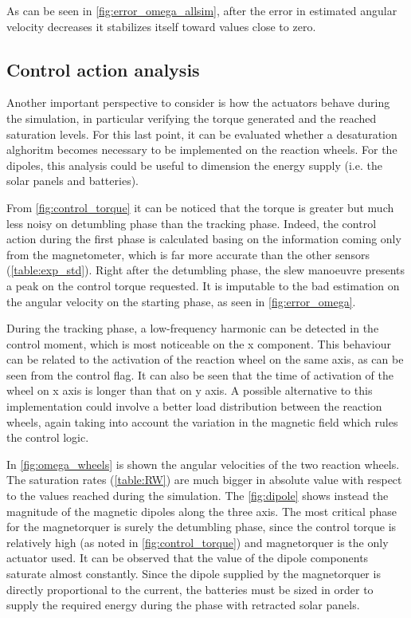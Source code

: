 As can be seen in \autoref{fig:error_omega_allsim}, after the error in estimated angular velocity decreases it stabilizes itself toward values close to zero.

\subsection{Control action analysis}
\label{subsec:control_analysis}

Another important perspective to consider is how the actuators behave during the simulation, in particular verifying the torque generated and the reached saturation levels. For this last point, it can be evaluated whether a desaturation alghoritm becomes necessary to be implemented on the reaction wheels. For the dipoles, this analysis could be useful to dimension the energy supply (i.e. the solar panels and batteries).


From \autoref{fig:control_torque} it can be noticed that the torque is greater but much less noisy on detumbling phase than the tracking phase. Indeed, the control action during the first phase is calculated basing on the information coming only from the magnetometer, which is far more accurate than the other sensors (\autoref{table:exp_std}). Right after the detumbling phase, the slew manoeuvre presents a peak on the control torque requested. It is imputable to the bad estimation on the angular velocity on the starting phase, as seen in \autoref{fig:error_omega}.

During the tracking phase, a low-frequency harmonic can be detected in the control moment, which is most noticeable on the x component. This behaviour can be related to the activation of the reaction wheel on the same axis, as can be seen from the control flag. It can also be seen that the time of activation of the wheel on x axis is longer than that on y axis. A possible alternative to this implementation could involve a better load distribution between the reaction wheels, again taking into account the variation in the magnetic field which rules the control logic.


In \autoref{fig:omega_wheels} is shown the angular velocities of the two reaction wheels. The saturation rates (\autoref{table:RW}) are much bigger in absolute value with respect to the values reached during the simulation.
The \autoref{fig:dipole} shows instead the magnitude of the magnetic dipoles along the three axis. The most critical phase for the magnetorquer is surely the detumbling phase, since the control torque is relatively high (as noted in \autoref{fig:control_torque}) and magnetorquer is the only actuator used.
It can be observed that the value of the dipole components saturate almost constantly. Since the dipole supplied by the magnetorquer is directly proportional to the current, the batteries must be sized in order to supply the required energy during the phase with retracted solar panels.